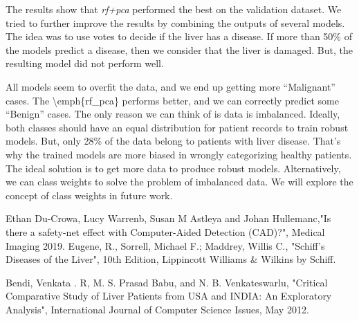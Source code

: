 \documentclass[]{article}
\begin{document}
The results show that \emph{rf+pca} performed the best on the validation
dataset. We tried to further improve the results by combining the
outputs of several models. The idea was to use votes to decide if the
liver has a disease. If more than 50\% of the models predict a disease,
then we consider that the liver is damaged. But, the resulting model did
not perform well.

All models seem to overfit the data, and we end up getting more
``Malignant'' cases. The \textbackslash emph\{rf\_pca\} performs better,
and we can correctly predict some ``Benign'' cases. The only reason we
can think of is data is imbalanced. Ideally, both classes should have an
equal distribution for patient records to train robust models. But, only
28\% of the data belong to patients with liver disease. That's why the
trained models are more biased in wrongly categorizing healthy patients.
The ideal solution is to get more data to produce robust models.
Alternatively, we can class weights to solve the problem of imbalanced
data. We will explore the concept of class weights in future work.

\begin{thebibliography}{9}
Ethan Du-Crowa, Lucy Warrenb, Susan M Astleya and Johan Hullemanc,"Is there a safety-net effect with Computer-Aided Detection (CAD)?", Medical Imaging 2019.
Eugene, R., Sorrell, Michael F.; Maddrey, Willis C., "Schiff's Diseases of the Liver", 10th Edition, Lippincott Williams \& Wilkins by Schiff.

Bendi,  Venkata . R, M. S. Prasad Babu, and N. B. Venkateswarlu, "Critical Comparative Study of Liver Patients from USA and INDIA: An Exploratory Analysis", International Journal of Computer Science Issues, May 2012.


\end{thebibliography}
\end{document}
